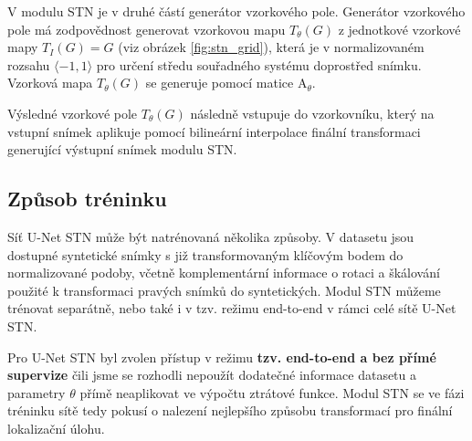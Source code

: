 V modulu STN je v druhé částí generátor vzorkového pole. Generátor vzorkového pole má zodpovědnost generovat vzorkovou mapu $T_{\theta}(G)$ z jednotkové vzorkové mapy $T_{I}(G) = G$ (viz obrázek \ref{fig:stn_grid}), která je v normalizovaném rozsahu $\langle-1, 1\rangle$ pro určení středu souřadného systému doprostřed snímku. Vzorková mapa $T_{\theta}(G)$ se generuje pomocí matice $\displaystyle \mathrm {A}_\theta$. 

Výsledné vzorkové pole $T_{\theta}(G)$ následně vstupuje do vzorkovníku, který na vstupní snímek aplikuje pomocí bilineární interpolace finální transformaci generující výstupní snímek modulu STN.

\subsection{Způsob tréninku}

Síť U-Net STN může být natrénovaná několika způsoby. V datasetu jsou dostupné syntetické snímky s již transformovaným klíčovým bodem do normalizované podoby, včetně komplementární informace o rotaci a škálování použité k transformaci pravých snímků do syntetických. Modul STN můžeme trénovat separátně, nebo také i v tzv. režimu end-to-end v rámci celé sítě U-Net STN.

Pro U-Net STN byl zvolen přístup v režimu \textbf{tzv. end-to-end a bez přímé supervize} čili jsme se rozhodli nepoužít dodatečné informace datasetu a parametry $\theta$ přímě neaplikovat ve výpočtu ztrátové funkce. Modul STN se ve fázi tréninku sítě tedy pokusí o nalezení nejlepšího způsobu transformací pro finální lokalizační úlohu.

\endinput
